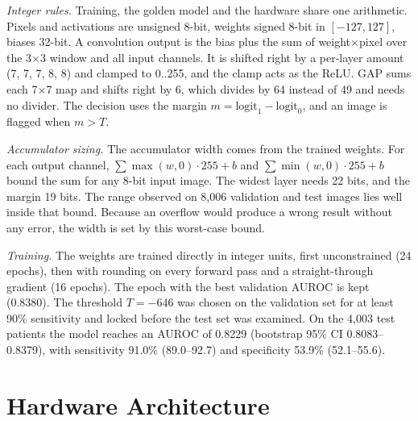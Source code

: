 \documentclass[conference]{IEEEtran}
\begin{document}
\textit{Integer rules.} Training, the golden model and the hardware share one arithmetic.
Pixels and activations are unsigned 8-bit, weights signed 8-bit in $[-127,127]$, biases 32-bit.
A convolution output is the bias plus the sum of weight$\times$pixel over the 3$\times$3 window
and all input channels. It is shifted right by a per-layer amount (7, 7, 7, 8, 8) and clamped to
0..255, and the clamp acts as the ReLU. GAP sums each 7$\times$7 map and shifts right by 6, which
divides by 64 instead of 49 and needs no divider. The decision uses the margin
$m=\text{logit}_1-\text{logit}_0$, and an image is flagged when $m>T$.

\textit{Accumulator sizing.} The accumulator width comes from the trained weights. For each
output channel, $\sum\max(w,0)\cdot255+b$ and $\sum\min(w,0)\cdot255+b$ bound the sum for any
8-bit input image. The widest layer needs 22 bits, and the margin 19 bits. The range observed on
8,006 validation and test images lies well inside that bound. Because an overflow would produce a
wrong result without any error, the width is set by this worst-case bound.

\textit{Training.} The weights are trained directly in integer units, first unconstrained (24
epochs), then with rounding on every forward pass and a straight-through gradient (16 epochs).
The epoch with the best validation AUROC is kept (0.8380). The threshold $T=-646$ was chosen on
the validation set for at least 90\% sensitivity and locked before the test set was examined.
On the 4,003 test patients the model reaches an AUROC of 0.8229 (bootstrap 95\% CI
0.8083--0.8379), with sensitivity 91.0\% (89.0--92.7) and specificity 53.9\% (52.1--55.6).

\section{Hardware Architecture}\label{sec:hw}
\end{document}
